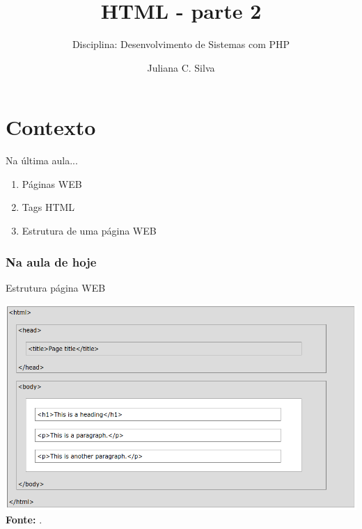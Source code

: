 \documentclass{beamer}
\title[HTML]{HTML - parte 2}
\subtitle{Disciplina: Desenvolvimento de Sistemas com PHP}
\author{Juliana C. Silva}
\institute{Universidade Positivo}
\begin{document}
\frame{\titlepage}
 

\section{Contexto}
\begin{frame}{Na última aula...}
  \begin{enumerate}
   \item Páginas WEB
   \item Tags HTML
   \item Estrutura de uma página WEB
  \end{enumerate}
\end{frame}
\begin{frame}
\frametitle{Na aula de hoje} 
\tableofcontents 
\end{frame}
\begin{frame}{Estrutura página WEB}
		\begin{center}
\includegraphics[height=0.65\paperheight]{fig/aula2/html_page.png} \\
    		\tiny \textbf{Fonte:} \cite{wschool2021html}.
		\end{center}
\end{frame}
\end{document}
